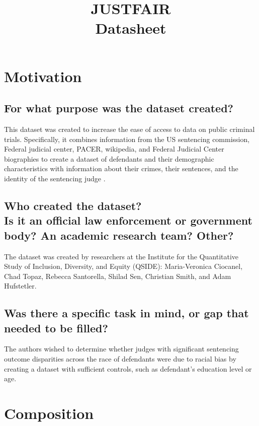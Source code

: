 \documentclass[letterpaper, 10 pt, conference]{ieeeconf}  %
\title{\LARGE \bf
JUSTFAIR \\{\color{blue}Datasheet}
}
\newcommand{\subtitle}[1]{{\\ \small \normalfont \color{purple} #1}}
\begin{document}
\maketitle
\thispagestyle{empty}
\pagestyle{empty}

\section{Motivation}

\subsection{For what purpose was the dataset created?}

This dataset was created to increase the ease of access to data on public criminal trials. Specifically, it combines information from the US sentencing commission, Federal judicial center, PACER, wikipedia, and Federal Judicial Center biographies to create a dataset of defendants and their demographic characteristics with information about their crimes, their sentences, and the identity of the sentencing judge \cite{ciocanel2020justfair}.

\subsection{Who created the dataset? \subtitle{Is it an official law enforcement or government body? An academic research team? Other?}}

The dataset was created by researchers at the Institute for the Quantitative Study of Inclusion, Diversity, and Equity (QSIDE): Maria-Veronica Ciocanel, Chad Topaz, Rebecca Santorella, Shilad Sen, Christian Smith, and Adam Hufstetler.

\subsection{Was there a specific task in mind, or gap that needed to be filled?}

The authors wished to determine whether judges with significant sentencing outcome disparities across the race of defendants were due to racial bias by creating a dataset with sufficient controls, such as defendant’s education level or age.

\section{Composition}
\end{document}

